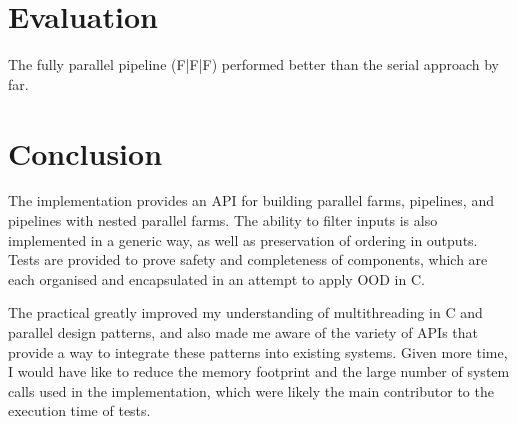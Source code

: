 \documentclass[12pt]{article}
\begin{document}
\section{Evaluation}

The fully parallel pipeline (F|F|F) performed better than the serial approach by far. 


\section{Conclusion}
 
The implementation provides an API for building parallel farms, pipelines, and pipelines with nested parallel farms. The ability to filter inputs is also implemented in a generic way, as well as preservation of ordering in outputs. Tests are provided to prove safety and completeness of components, which are each organised and encapsulated in an attempt to apply OOD in C.

The practical greatly improved my understanding of multithreading in C and parallel design patterns, and also made me aware of the variety of APIs that provide a way to integrate these patterns into existing systems. Given more time, I would have like to reduce the memory footprint and the large number of system calls used in the implementation, which were likely the main contributor to the execution time of tests. 



\end{document}
